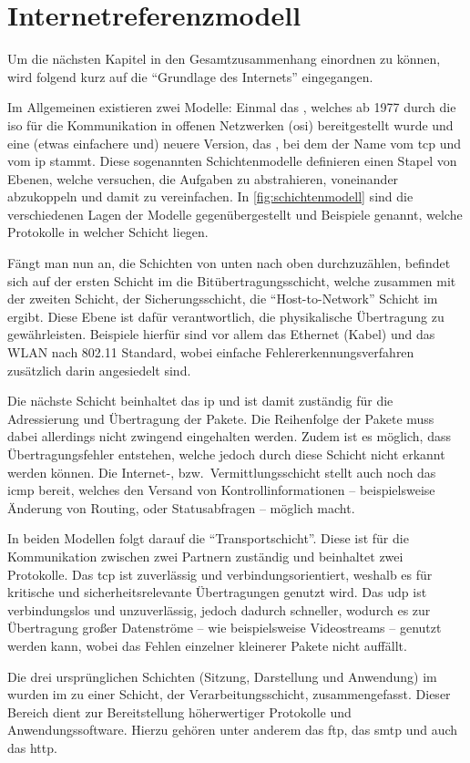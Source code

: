 \section{Internetreferenzmodell}\label{sec:internetreferenzmodell}
	Um die nächsten Kapitel in den Gesamtzusammenhang einordnen zu können,
	wird folgend kurz auf die \enquote{Grundlage des Internets} eingegangen.

	Im Allgemeinen existieren zwei Modelle:
	Einmal das \isoOsi,
	welches ab 1977 durch die \gls{iso}
	für die Kommunikation in offenen Netzwerken (\gls{osi})
	bereitgestellt wurde
	und eine (etwas einfachere und) neuere Version,
	das \tcpIp,
	bei dem der Name vom \gls{tcp} und vom \gls{ip} stammt.
	Diese sogenannten Schichtenmodelle definieren einen Stapel von Ebenen,
	welche versuchen,
	die Aufgaben zu abstrahieren,
	voneinander abzukoppeln und damit zu vereinfachen.
	In \vref{fig:schichtenmodell} sind die verschiedenen Lagen der Modelle gegenübergestellt
	und Beispiele genannt,
	welche Protokolle in welcher Schicht liegen.

	Fängt man nun an,
	die Schichten von unten nach oben durchzuzählen,
	befindet sich auf der ersten Schicht im \isoOsi{} die Bitübertragungsschicht,
	welche zusammen mit der zweiten Schicht,
	der Sicherungsschicht,
	die \enquote{Host-to-Network} Schicht im \tcpIp{} ergibt.
	Diese Ebene ist dafür verantwortlich,
	die physikalische Übertragung zu gewährleisten.
	Beispiele hierfür sind vor allem das Ethernet (Kabel)
	und das WLAN nach  802.11 Standard,
	wobei einfache Fehlererkennungsverfahren zusätzlich darin angesiedelt sind.

	Die nächste Schicht beinhaltet das \gls{ip}
	und ist damit zuständig für die Adressierung und Übertragung der Pakete.
	Die Reihenfolge der Pakete muss dabei allerdings nicht zwingend eingehalten werden.
	Zudem ist es möglich,
	dass Übertragungsfehler entstehen,
	welche jedoch durch diese Schicht nicht erkannt werden können.
	Die Internet-, bzw.\ Vermittlungsschicht stellt auch noch das \gls{icmp} bereit,
	welches den Versand von Kontrollinformationen
	-- beispielsweise Änderung von Routing, oder Statusabfragen --
	möglich macht.

	In beiden Modellen folgt darauf die \enquote{Transportschicht}.
	Diese ist für die Kommunikation zwischen zwei Partnern zuständig und beinhaltet zwei Protokolle.
	Das \gls{tcp} ist zuverlässig und verbindungsorientiert,
	weshalb es für kritische und sicherheitsrelevante Übertragungen genutzt wird.
	Das \gls{udp} ist verbindungslos und unzuverlässig,
	jedoch dadurch schneller,
	wodurch es zur Übertragung großer Datenströme --
	wie beispielsweise Videostreams -- genutzt werden kann,
	wobei das Fehlen einzelner kleinerer Pakete nicht auffällt.

	Die drei ursprünglichen Schichten (Sitzung, Darstellung und Anwendung) im \isoOsi{}
	wurden im \tcpIp{} zu einer Schicht,
	der Verarbeitungsschicht,
	zusammengefasst.
	Dieser Bereich dient zur Bereitstellung höherwertiger Protokolle und Anwendungssoftware.
	Hierzu gehören unter anderem das \gls{ftp}, das \gls{smtp} und auch das \gls{http}.